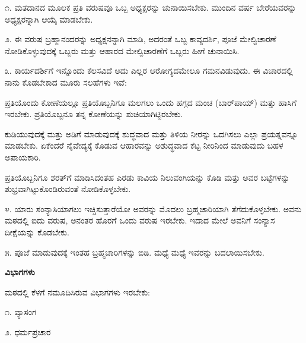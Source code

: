 ೧. ಮತದಾನದ ಮೂಲಕ ಪ್ರತಿ ವರುಷವೂ ಒಬ್ಬ ಅಧ್ಯಕ್ಷರನ್ನು ಚುನಾಯಿಸಬೇಕು. ಮುಂದಿನ ವರ್ಷ ಬೇರೆಯವರನ್ನು ಅಧ್ಯಕ್ಷರನ್ನಾಗಿ ಆಯ್ಕೆ ಮಾಡಬೇಕು.

\vspace{0.13cm}

೨. ಈ ವರುಷ ಬ್ರಹ್ಮಾನಂದರನ್ನು ಅಧ್ಯಕ್ಷನನ್ನಾಗಿ ಮಾಡಿ, ಅದರಂತೆ ಒಬ್ಬ ಕಾವ್ಯದರ್ಶಿ, ಪೂಜೆ ಮೇಲ್ವಿಚಾರಣೆ ನೋಡಿಕೊಳ್ಳುವುದಕ್ಕೆ ಒಬ್ಬರು ಮತ್ತು ಆಹಾರದ ಮೇಲ್ವಿಚಾರಣೆಗೆ ಒಬ್ಬರು\enginline{-} ಹೀಗೆ ಚುನಾಯಿಸಿ.

\vspace{0.13cm}

೩. ಕಾರ್ಯದರ್ಶಿಗೆ ಇನ್ನೊಂದು ಕೆಲಸವಿದೆ ಅದು ಎಲ್ಲರ ಆರೋಗ್ಯದಮೇಲೂ ಗಮನವಿಡುವುದು. ಈ ವಿಚಾರದಲ್ಲಿ ನಾನು ಕೊಡಬೇಕಾದ ಮೂರು ಸಲಹೆಗಳು ಇವೆ:
\begin{flushright}
 ಪ್ರತಿಯೊಂದು ಕೋಣೆಯಲ್ಲೂ ಪ್ರತಿಯೊಬ್ಬನಿಗೂ ಮಲಗಲು ಒಂದು ಹಗ್ಗದ ಮಂಚ (ಬಾರ್‌ಪಾಯ್) ಮತ್ತು ಹಾಸಿಗೆ ಇರಬೇಕು. ಪ್ರತಿಯೊಬ್ಬನೂ ತನ್ನ ಕೋಣೆಯನ್ನು ಶುಚಿಯಾಗಿಟ್ಟಿರಬೇಕು.
\end{flushright}

\vspace{0.13cm}

 ಕುಡಿಯುವುದಕ್ಕೆ ಮತ್ತು ಅಡಿಗೆ ಮಾಡುವುದಕ್ಕೆ ಶುದ್ಧವಾದ ಮತ್ತು ತಿಳಿಯ ನೀರನ್ನು ಒದಗಿಸಲು ಎಲ್ಲಾ ಪ್ರಯತ್ನವನ್ನೂ ಮಾಡಬೇಕು. ಏಕೆಂದರೆ ನೈವೇದ್ಯಕ್ಕೆ ಕೊಡುವ ಆಹಾರವನ್ನು ಅಶುದ್ಧವಾದ ಕೆಟ್ಟ ನೀರಿನಿಂದ ಮಾಡುವುದು ಬಹಳ ಅಪಾಯಕಾರಿ.

\vspace{0.13cm}

 ಪ್ರತಿಯೊಬ್ಬನಿಗೂ ಶರತ್‌ಗೆ ಮಾಡಿಸಿದಂತಹ ಎರಡು ಕಾವಿಯ ನಿಲುವಂಗಿಯನ್ನು ಕೊಡಿ ಮತ್ತು ಅವರ ಬಟ್ಟೆಗಳನ್ನು ಶುಭ್ರವಾಗಿಟ್ಟುಕೊಂಡಿರುವಂತೆ ನೋಡಿಕೊಳ್ಳಬೇಕು.

\vspace{0.13cm}

೪. ಯಾರು ಸಂನ್ಯಾಸಿಯಾಗಲು ಇಚ್ಚಿಸುತ್ತಾರೆಯೋ ಅವರನ್ನು ಮೊದಲು ಬ್ರಹ್ಮಚಾರಿಯಾಗಿ ತೆಗೆದುಕೊಳ್ಳಬೇಕು. ಅವನು ಮಠದಲ್ಲಿ ಐದು ವರುಷ, ಅನಂತರ ಹೊರಗೆ ಒಂದು ವರುಷ ಇರಬೇಕು. ಇದಾದ ಮೇಲೆ ಅವನಿಗೆ ಸಂನ್ಯಾಸ ದೀಕ್ಷೆಯನ್ನು ಕೊಡಬೇಕು.

\eject

೫. ಪೂಜೆ ಮಾಡುವುದಕ್ಕೆ ಇಂತಹ ಬ್ರಹ್ಮಚಾರಿಗಳನ್ನು ಬಿಡಿ. ಮಧ್ಯೆ ಮಧ್ಯೆ ಇವರನ್ನು ಬದಲಾಯಿಸಬೇಕು.

\begin{center}
\textbf{ವಿಭಾಗಗಳು}
\end{center}

ಮಠದಲ್ಲಿ ಕೆಳಗೆ ನಮೂದಿಸಿರುವ ವಿಭಾಗಗಳು ಇರಬೇಕು:

\vspace{0.15cm}

೧. ವ್ಯಾಸಂಗ

\vspace{0.13cm}

೨. ಧರ್ಮಪ್ರಚಾರ


